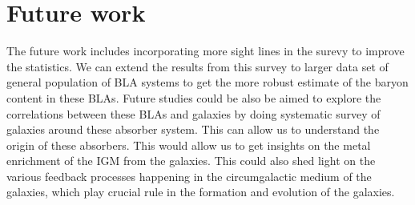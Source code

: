 \section{Future work}

The future work includes incorporating more sight lines in the surevy to improve the statistics. We can extend the results from this survey to larger data set of general population of BLA systems to get the more robust estimate of the baryon content in these BLAs. Future studies could be also be aimed to explore the correlations between these BLAs and galaxies by doing systematic survey of galaxies around these absorber system. This can allow us to understand the origin of these absorbers. This would allow us to get insights on the metal enrichment of the IGM from the galaxies. This could also shed light on the various feedback processes happening in the circumgalactic medium of the galaxies, which play crucial rule in the formation and evolution of the galaxies.  

